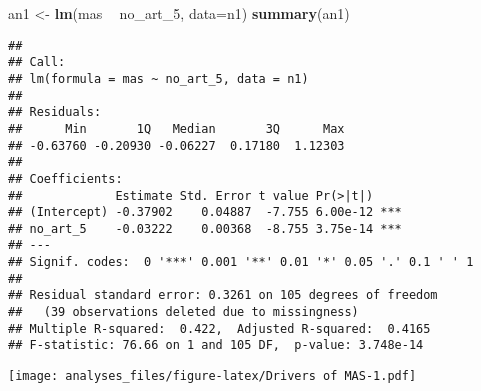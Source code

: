 \documentclass[]{article}
\newenvironment{Shaded}{\begin{snugshade}}{\end{snugshade}}
\newcommand{\KeywordTok}[1]{\textcolor[rgb]{0.13,0.29,0.53}{\textbf{#1}}}
\newcommand{\DataTypeTok}[1]{\textcolor[rgb]{0.13,0.29,0.53}{#1}}
\newcommand{\DecValTok}[1]{\textcolor[rgb]{0.00,0.00,0.81}{#1}}
\newcommand{\StringTok}[1]{\textcolor[rgb]{0.31,0.60,0.02}{#1}}
\newcommand{\OperatorTok}[1]{\textcolor[rgb]{0.81,0.36,0.00}{\textbf{#1}}}
\newcommand{\NormalTok}[1]{#1}
\begin{document}
\begin{Shaded}
\begin{Highlighting}[]
\NormalTok{an1 <-}\StringTok{ }\KeywordTok{lm}\NormalTok{(mas }\OperatorTok{~}\StringTok{ }\NormalTok{no_art_}\DecValTok{5}\NormalTok{, }\DataTypeTok{data=}\NormalTok{n1)}
\KeywordTok{summary}\NormalTok{(an1)}
\end{Highlighting}
\end{Shaded}

\begin{verbatim}
## 
## Call:
## lm(formula = mas ~ no_art_5, data = n1)
## 
## Residuals:
##      Min       1Q   Median       3Q      Max 
## -0.63760 -0.20930 -0.06227  0.17180  1.12303 
## 
## Coefficients:
##             Estimate Std. Error t value Pr(>|t|)    
## (Intercept) -0.37902    0.04887  -7.755 6.00e-12 ***
## no_art_5    -0.03222    0.00368  -8.755 3.75e-14 ***
## ---
## Signif. codes:  0 '***' 0.001 '**' 0.01 '*' 0.05 '.' 0.1 ' ' 1
## 
## Residual standard error: 0.3261 on 105 degrees of freedom
##   (39 observations deleted due to missingness)
## Multiple R-squared:  0.422,  Adjusted R-squared:  0.4165 
## F-statistic: 76.66 on 1 and 105 DF,  p-value: 3.748e-14
\end{verbatim}

\begin{Shaded}
\end{Shaded}

\texttt{[image: analyses\_files/figure-latex/Drivers of MAS-1.pdf]}
\end{document}
